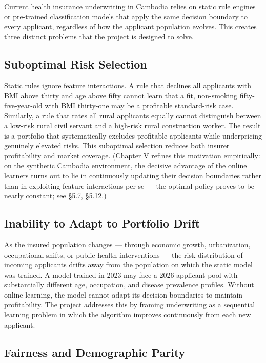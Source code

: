 Current health insurance underwriting in Cambodia relies on static rule engines or pre-trained classification models that apply the same decision boundary to every applicant, regardless of how the applicant population evolves. This creates three distinct problems that the project is designed to solve.

\subsection{Suboptimal Risk Selection}\label{suboptimal-risk-selection}

Static rules ignore feature interactions. A rule that declines all applicants with BMI above thirty and age above fifty cannot learn that a fit, non-smoking fifty-five-year-old with BMI thirty-one may be a profitable standard-risk case. Similarly, a rule that rates all rural applicants equally cannot distinguish between a low-risk rural civil servant and a high-risk rural construction worker. The result is a portfolio that systematically excludes profitable applicants while underpricing genuinely elevated risks. This suboptimal selection reduces both insurer profitability and market coverage. (Chapter V refines this motivation empirically: on the synthetic Cambodia environment, the decisive advantage of the online learners turns out to lie in continuously updating their decision boundaries rather than in exploiting feature interactions per se --- the optimal policy proves to be nearly constant; see §5.7, §5.12.)

\subsection{Inability to Adapt to Portfolio Drift}\label{inability-to-adapt-to-portfolio-drift}

As the insured population changes --- through economic growth, urbanization, occupational shifts, or public health interventions --- the risk distribution of incoming applicants drifts away from the population on which the static model was trained. A model trained in 2023 may face a 2026 applicant pool with substantially different age, occupation, and disease prevalence profiles. Without online learning, the model cannot adapt its decision boundaries to maintain profitability. The project addresses this by framing underwriting as a sequential learning problem in which the algorithm improves continuously from each new applicant.

\subsection{Fairness and Demographic Parity}\label{fairness-and-demographic-parity}

